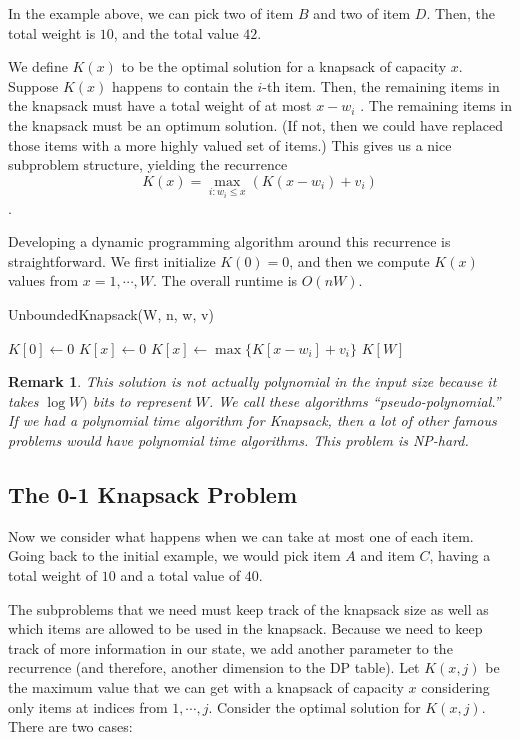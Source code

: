 \documentclass [12pt]{article}
\newtheorem{remark}{Remark}
\theoremstyle{definition}
\begin{document}
In the example above, we can pick two of item $B$ and two of item $D$. Then, the total weight is $10$, and the total value $42$. 

We define $K(x)$ to be the optimal solution for a knapsack of capacity $x$. Suppose $K(x)$ happens to contain the $i$-th item. Then, the remaining items in the knapsack must have a total weight of at most $x -  w_i$ . The remaining items in the knapsack must be an optimum solution. (If not, then we could have replaced those items with a more highly valued set of items.) This gives us a nice subproblem structure, yielding the recurrence
$$
K(x) = \max_{i:w_i\leq x}(K(x - w_i ) + v_i )
$$.

Developing a dynamic programming algorithm around this recurrence is straightforward. We first initialize $K(0) = 0$, and then we compute $K(x)$ values from $x = 1, \cdots , W$. The overall runtime is $O(nW)$.

\begin{algorithm}
\caption{UnboundedKnapsack(W, n, w, v)}
\label{alg:unboundedknapsack}
\begin{algorithmic}
\STATE $K[0]\gets 0$
  \STATE $K[x] \gets 0$
      \STATE $K[x] \gets \max\{K[x-w_i] + v_i \}$
    \ENDIF
  \ENDFOR
\ENDFOR
\RETURN $K[W]$
\end{algorithmic}
\end{algorithm}

\begin{remark}This solution is not actually polynomial in the input size because it takes $\log W)$ bits to represent $W$. We call these algorithms ``pseudo-polynomial.'' If we had a polynomial time algorithm for Knapsack, then a lot of other famous problems would have polynomial time algorithms. This problem is NP-hard.
\end{remark}

\subsection{The 0-1 Knapsack Problem}
Now we consider what happens when we can take at most one of each item. Going back to the initial example, we would pick item $A$ and item $C$, having a total weight of $10$ and a total value of $40$.

The subproblems that we need must keep track of the knapsack size as well as which items are allowed to be used in the knapsack. Because we need to keep track of more information in our state, we add another parameter to the recurrence (and therefore, another dimension to the DP table). Let $K(x, j)$ be the maximum value that we can get with a knapsack of capacity $x$ considering only items at indices from $1, \cdots , j$. Consider the optimal solution for $K(x, j)$. There are two cases: 
\end{document}

